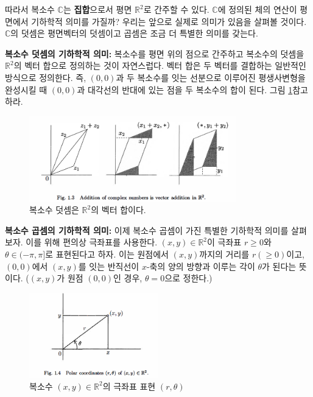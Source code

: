 따라서 복소수 $\mathbb C$는 {\bf 집합}으로서 평면 $\mathbb R^2$로 간주할 수 있다.
$\mathbb C$에 정의된 체의 연산이 평면에서 기하학적 의미를 가질까?
우리는 앞으로 실제로 의미가 있음을 살펴볼 것이다.
$\mathbb C$의 덧셈은 평면벡터의 덧셈이고
곱셈은 조금 더 특별한 의미를 갖는다.

{\bf 복소수 덧셈의 기하학적 의미: }
복소수를 평면 위의 점으로 간주하고 복소수의 덧셈을 $\mathbb R^2$의 벡터 합으로 
정의하는 것이 자연스럽다. 
벡터 합은 두 벡터를 결합하는 일반적인 방식으로 정의한다.
즉, $(0,0)$과 두 복소수를 잇는 선분으로 이루어진 평생사변형을 완성시킬 때
$(0,0)$과 대각선의 반대에 있는 점을 두 복소수의 합이 된다.
그림 \ref{fig-1-3}\을 참고하라.

\begin{figure}[!h]
\begin{center}
\includegraphics[width=0.8\textwidth]{./SaltChapter/fig-1-3}
\end{center}
\caption{복소수 덧셈은 $\mathbb R^2$의 벡터 합이다.}
\label{fig-1-3}
\end{figure}

{\bf  복소수 곱셈의 기하학적 의미: }
이제 복소수 곱셈이 가진 특별한 기하학적 의미를 살펴보자.
이를 위해 편의상 극좌표를 사용한다.
$(x,y)\in\mathbb R^2$이 극좌표 $r\ge 0$와 $\theta\in(-\pi,\pi]$로 표현된다고 하자.
이는 원점에서 $(x,y)$까지의 거리를 $r(\ge0)$이고,
$(0,0)$에서 $(x,y)$를 잇는 반직선이 $x$-축의 양의 방향과 이루는 각이 $\theta$가 된다는 뜻이다.
($(x,y)$가 원점 $(0,0)$인 경우, $\theta=0$으로 정한다.)

\begin{figure}[!h]
\begin{center}
\includegraphics[width=0.5\textwidth]{./SaltChapter/fig-1-4}
\end{center}
\caption{복소수 $(x,y)\in\mathbb R^2$의 극좌표 표현 $(r, \theta)$}
\label{fig-1-4}
\end{figure}

